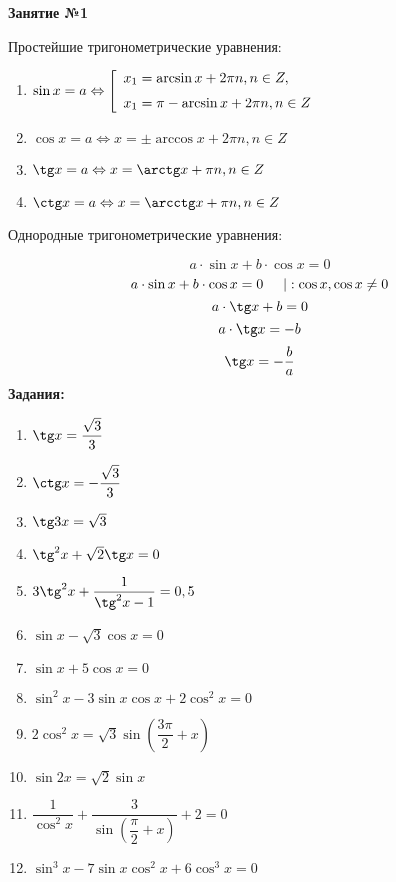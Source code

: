 \documentclass[12pt, a4paper]{article}
\begin{document}
	
   \cfoot{}
\begin{center}
	\Large
	\textbf{Занятие №1}
\end{center}
\begin{center}
	\large
	Простейшие тригонометрические уравнения:
\end{center}
\begin{enumerate}[label=\arabic*)]
	\item \( \sin x = a \Leftrightarrow \left[
	\begin{array}{l}
		x_1 = \arcsin x + 2\pi n, n \in Z,\vspace{0,2cm}\\
		x_1 = \pi - \arcsin x + 2\pi n, n \in Z
	\end{array}
	\right. \)
	\item \( \cos x = a \Leftrightarrow x=\pm \arccos x + 2\pi n, n \in Z \)
	\item \( \tg x = a \Leftrightarrow x=\arctg x + \pi n, n \in Z \)
	\item \( \ctg x = a \Leftrightarrow x=\arcctg x + \pi n, n \in Z \)
\end{enumerate}
\begin{center}
	\large
	Однородные тригонометрические уравнения:
\end{center}
\[ a\cdot\sin x + b\cdot\cos x = 0 \]
\[ a\cdot\sin x + b\cdot\cos x = 0\hspace{0,5cm} |:\cos x, \cos x\neq0\]
\[ a\cdot\tg x + b = 0 \]
\[ a\cdot\tg x = -b \]
\[ \tg x = -\dfrac{b}{a} \]
\textbf{\large Задания:}
\begin{multicols}{2}
	\begin{enumerate}[label=\textbf{\arabic*.}]
		\item \( \tg x = \dfrac{\sqrt{3}}{3} \)
		\item \( \ctg x = - \dfrac{\sqrt{3}}{3} \)
		\item \( \tg 3x = \sqrt{3} \)
		\item \( \tg^2 x + \sqrt{2}\tg x = 0 \)
		\item \( 3\tg^2 x + \dfrac{1}{\tg^2 x -1} = 0,5\)
		\item \( \sin x - \sqrt{3}\cos x = 0 \)
		\item \( \sin x + 5\cos x = 0 \)
		\item \( \sin^2 x - 3\sin x\cos x + 2\cos^2 x = 0 \)
		\item \( 2\cos^2 x = \sqrt{3}\sin\left( \dfrac{3\pi}{2}+x \right) \)
		\item \( \sin 2x=\sqrt{2}\sin x \)
		\item \( \dfrac{1}{\cos^2 x}+\dfrac{3}{\sin\left( \dfrac{\pi}{2}+x \right)}+2=0 \)
		\item \( \sin^3 x - 7\sin x \cos^2 x + 6\cos^3 x = 0 \)
	\end{enumerate}
\end{multicols}
\end{document}
